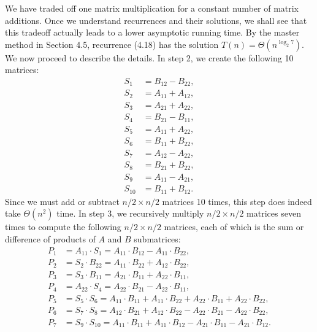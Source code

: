 \documentclass{report}
\begin{document}
        \bigbreak \noindent 
        We have traded off one matrix multiplication for a constant number of matrix additions. Once we understand recurrences and their solutions, we shall see that this tradeoff actually leads to a lower asymptotic running time. By the master method in Section 4.5, recurrence (4.18) has the solution \(T(n) = \Theta(n^{\log_2 7})\).
        \bigbreak \noindent 
        We now proceed to describe the details. In step 2, we create the following 10 matrices:
        \[
            \begin{aligned}
                S_1 &= B_{12} - B_{22}, \\
                S_2 &= A_{11} + A_{12}, \\
                S_3 &= A_{21} + A_{22}, \\
                S_4 &= B_{21} - B_{11}, \\
                S_5 &= A_{11} + A_{22}, \\
                S_6 &= B_{11} + B_{22}, \\
                S_7 &= A_{12} - A_{22}, \\
                S_8 &= B_{21} + B_{22}, \\
                S_9 &= A_{11} - A_{21}, \\
                S_{10} &= B_{11} + B_{12}.
            \end{aligned}
        \]
        Since we must add or subtract \(n/2 \times n/2\) matrices 10 times, this step does indeed take \(\Theta(n^2)\) time.
        \bigbreak \noindent 
        In step 3, we recursively multiply \(n/2 \times n/2\) matrices seven times to compute the following \(n/2 \times n/2\) matrices, each of which is the sum or difference of products of \(A\) and \(B\) submatrices:
        \[
            \begin{aligned}
                P_1 &= A_{11} \cdot S_1 = A_{11} \cdot B_{12} - A_{11} \cdot B_{22}, \\
                P_2 &= S_2 \cdot B_{22} = A_{11} \cdot B_{22} + A_{12} \cdot B_{22}, \\
                P_3 &= S_3 \cdot B_{11} = A_{21} \cdot B_{11} + A_{22} \cdot B_{11}, \\
                P_4 &= A_{22} \cdot S_4 = A_{22} \cdot B_{21} - A_{22} \cdot B_{11}, \\
                P_5 &= S_5 \cdot S_6 = A_{11} \cdot B_{11} + A_{11} \cdot B_{22} + A_{22} \cdot B_{11} + A_{22} \cdot B_{22}, \\
                P_6 &= S_7 \cdot S_8 = A_{12} \cdot B_{21} + A_{12} \cdot B_{22} - A_{22} \cdot B_{21} - A_{22} \cdot B_{22}, \\
                P_7 &= S_9 \cdot S_{10} = A_{11} \cdot B_{11} + A_{11} \cdot B_{12} - A_{21} \cdot B_{11} - A_{21} \cdot B_{12}.
            \end{aligned}
        \]
\end{document}
